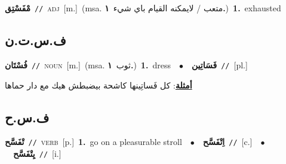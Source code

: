 \documentclass[10pt,a4paper,twoside]{article} %
\begin{document}
\begin{multicols}{2}
{\setlength\topsep{0pt}\textbf{\foreignlanguage{arabic}{مْفَسْتِق}}\ {\color{gray}\texttt{//}\color{black}}\ \textsc{adj}\ [m.]\ \color{gray}(msa. \foreignlanguage{arabic}{متعب / لايمكنه القيام باي شيء}~\foreignlanguage{arabic}{\textbf{١.}})\color{black}\ \textbf{1.}~exhausted\ } \vspace{2mm}

\vspace{-3mm}
\subsection*{\color{blue}\foreignlanguage{arabic}{ف.س.ت.ن}\color{blue}{}} 

{\setlength\topsep{0pt}\textbf{\foreignlanguage{arabic}{فُسْتَان}}\ {\color{gray}\texttt{//}\color{black}}\ \textsc{noun}\ [m.]\ \color{gray}(msa. \foreignlanguage{arabic}{ثوب}~\foreignlanguage{arabic}{\textbf{١.}})\color{black}\ \textbf{1.}~dress\ \ $\bullet$\ \ \setlength\topsep{0pt}\textbf{\foreignlanguage{arabic}{فَسَاتِين}}\ {\color{gray}\texttt{//}\color{black}}\ [pl.]\  \begin{flushright}\color{gray}\foreignlanguage{arabic}{\textbf{\underline{\foreignlanguage{arabic}{أمثلة}}}: كل فَساتِينها كاشحة بيضبطش هيك مع دار حماها}\end{flushright}\color{black}} \vspace{2mm}

\vspace{-3mm}
\subsection*{\color{blue}\foreignlanguage{arabic}{ف.س.ح}\color{blue}{}} 

{\setlength\topsep{0pt}\textbf{\foreignlanguage{arabic}{تْفَسَّح}}\ {\color{gray}\texttt{//}\color{black}}\ \textsc{verb}\ [p.]\ \textbf{1.}~go on a pleasurable stroll\ \ $\bullet$\ \ \setlength\topsep{0pt}\textbf{\foreignlanguage{arabic}{اِتْفَسَّح}}\ {\color{gray}\texttt{//}\color{black}}\ [c.]\ \ $\bullet$\ \ \setlength\topsep{0pt}\textbf{\foreignlanguage{arabic}{يِتْفَسَّح}}\ {\color{gray}\texttt{//}\color{black}}\ [i.]\ } \vspace{2mm}


\end{multicols}
\end{document}
